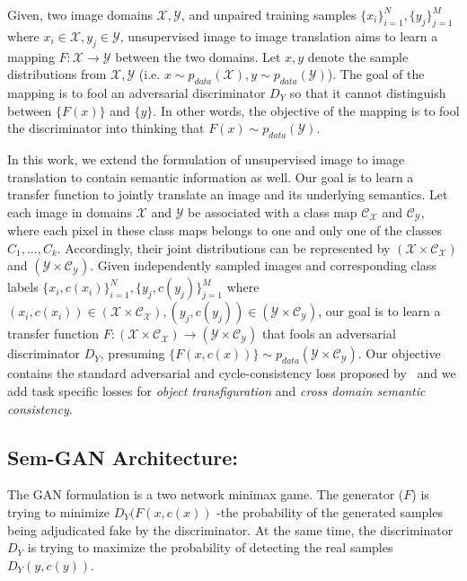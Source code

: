 Given, two image domains $\mathcal{X}, \mathcal{Y}$, and unpaired training samples $\{x_i\}_{i=1}^N, \{y_j\}_{j=1}^M$ where $x_i\in \mathcal{X}, y_j \in \mathcal{Y}$, unsupervised image to image translation aims to learn a mapping $F:\mathcal{X}\to\mathcal{Y}$ between the two domains. Let $x,y$ denote the sample distributions from $\mathcal{X},\mathcal{Y}$ (i.e. $x\sim p_{data}(\mathcal{X}), y \sim p_{data}(\mathcal{Y})$). The goal of the mapping is to fool an adversarial discriminator $D_Y$ so that it cannot distinguish between $\{F(x)\}$ and $\{y\}$. In other words, the objective of the mapping is to fool the discriminator into thinking that $F(x) \sim p_{data}(\mathcal{Y})$.

In this work, we extend the formulation of unsupervised image to image translation to contain semantic information as well. Our goal is to learn a transfer function to jointly translate an image and its underlying semantics. Let each image in  domains $\mathcal{X}$ and $\mathcal{Y}$ be associated with a class map $\mathcal{C_X}$ and $\mathcal{C_Y}$, where each pixel in these class maps belongs to one and only one of the classes $C_1, ..., C_k$. Accordingly, their joint distributions can be represented by $\left(\mathcal{ X \times C_X}\right)$ and $\left(\mathcal{Y \times C_Y}\right)$.  Given independently sampled images and corresponding class labels $\{x_i,c(x_i)\}_{i=1}^N, \{y_j,c(y_j)\}_{j=1}^M$ where  $(x_i,c(x_i)) \in \left(\mathcal{ X \times C_X}\right), (y_j,c(y_j)) \in \left(\mathcal{ Y \times C_Y}\right)$, our goal is to learn a transfer function $F:\left(\mathcal{ X \times C_X}\right) \to \left(\mathcal{ Y \times C_Y}\right)$ that fools an adversarial discriminator $D_Y$, presuming $\{F(x,c(x))\} \sim p_{data}(\mathcal{ Y \times C_Y})$. Our objective contains the standard adversarial and cycle-consistency loss proposed by~\cite{goodfellow_generative_2014, zhu_unpaired_2017} and we add task specific losses for \textit{object transfiguration} and \textit{cross domain semantic consistency}. 

\subsection{Sem-GAN Architecture:}
The GAN formulation is a two network minimax game. The generator ($F$) is trying to minimize $D_Y(F(x,c(x))$ -the probability of the generated samples being adjudicated fake by the discriminator. At the same time, the discriminator $D_Y$ is trying to maximize the probability of detecting the real samples $D_Y(y,c(y))$. 

